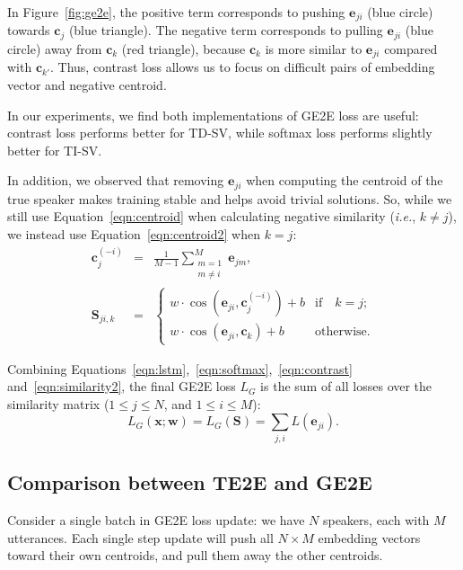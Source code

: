 \documentclass{article}
\newcommand{\vx}{\mathbf{x}}
\newcommand{\ve}{\mathbf{e}}
\newcommand{\vc}{\mathbf{c}}
\newcommand{\vw}{\mathbf{w}}
\newcommand{\ms}{\mathbf{S}}
\newcommand{\ie}{\textit{i.e.}, }
\begin{document}
In Figure~\ref{fig:ge2e}, the positive term corresponds to pushing $\ve_{ji}$ (blue circle) towards
$\vc_{j}$ (blue triangle).
The negative term corresponds to pulling $\ve_{ji}$ (blue circle)
away from $\vc_{k}$ (red triangle), because $\vc_k$ is more similar to $\ve_{ji}$
compared with $\vc_{k'}$.
Thus, contrast loss allows us to focus on difficult pairs of embedding vector and negative centroid.

In our experiments, we find both implementations of GE2E loss are useful: contrast loss
performs better for TD-SV, while softmax loss performs slightly better for TI-SV.

In addition, we observed that removing $\ve_{ji}$ when computing the centroid of the true speaker
makes training stable and helps avoid
trivial solutions.
So, while we still use Equation~\ref{eqn:centroid} when
calculating negative similarity (\ie $k\neq j$), we instead use
Equation~\ref{eqn:centroid2} when $k=j$:
\begin{eqnarray}
  \vc_{j}^{(-i)}&=&\frac{1}{M-1}\sum_{\substack{m=1\\m\neq i}}^{M}\ve_{jm},\label{eqn:centroid2} \\
  \ms_{ji,k} &=&
  \begin{cases}
    w\cdot \cos(\ve_{ji}, \vc_j^{(-i)})+b & \text{if} \quad k=j; \\
    w\cdot \cos(\ve_{ji}, \vc_k)+b & \text{otherwise}.
  \end{cases} \label{eqn:similarity2}
\end{eqnarray}

Combining Equations~\ref{eqn:lstm},~\ref{eqn:softmax},~\ref{eqn:contrast} and~\ref{eqn:similarity2},
the final GE2E loss $L_{G}$ is the sum of all losses over the similarity matrix ($1\leq j\leq N$, and $1\leq i\leq M$):
\begin{equation}
\label{eqn:ge2e}
  L_{G}(\vx;\vw)=L_{G}(\ms)=\sum_{j,i} L(\ve_{ji}).
\end{equation}

\subsection{Comparison between TE2E and GE2E}
\label{sec:ge2etheory}
Consider a single batch in GE2E loss update:
we have $N$ speakers, each with $M$ utterances. Each single step update will
push all $N\times M$ embedding vectors toward their own centroids, and pull them away the other centroids.
\end{document}
